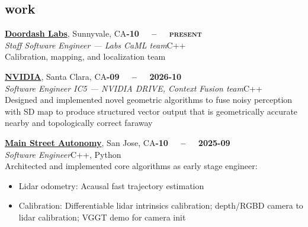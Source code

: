 \documentclass[margin,9pt]{res}
\begin{document}
\begin{resume}
\section{\sc \lsstyle work}
    \href{https://labs.doordash.com/}{\textbf{Doordash Labs}}, Sunnyvale, CA\hfill \textsc{\bfseries{}-10~~ -- ~~present}\\
    \textit{Staff Software Engineer --- Labs CaML team}\hfill C++
    \vspace{0.5em}\\
    Calibration, mapping, and localization team
    
    \href{https://nvidia.com}{\textbf{NVIDIA}}, Santa Clara, CA\hfill \textsc{\bfseries{}-09~~ -- ~~2026-10}\\
    \textit{Software Engineer IC5 --- \textsc{NVIDIA DRIVE}, Context Fusion team}\hfill C++
    \vspace{0.5em}\\
    Designed and implemented novel geometric algorithms to fuse noisy perception with SD map to produce structured vector output that is geometrically accurate nearby and topologically correct faraway

    \href{https://mainstreetautonomy.com}{\textbf{Main Street Autonomy}}, San Jose, CA\hfill \textsc{\bfseries{}-10~~ -- ~~2025-09}\\
    \textit{Software Engineer}\hfill C++, Python
    \vspace{0.5em}\\
    Architected and implemented core algorithms as early stage engineer:
    \begin{itemize}
        \item Lidar odometry: Acausal fast trajectory estimation
        \item Calibration: Differentiable lidar intrinsics calibration; depth/RGBD camera to lidar calibration; VGGT demo for camera init
    \end{itemize}
    

\end{resume}
\end{document}
